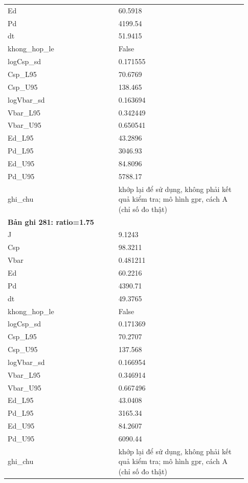 \begin{longtable}{p{0.43\linewidth}p{0.50\linewidth}}
Ed & 60.5918 \\
Pd & 4199.54 \\
dt & 51.9415 \\
khong\_\allowbreak hop\_\allowbreak le & False \\
logCsp\_\allowbreak sd & 0.171555 \\
Csp\_\allowbreak L95 & 70.6769 \\
Csp\_\allowbreak U95 & 138.465 \\
logVbar\_\allowbreak sd & 0.163694 \\
Vbar\_\allowbreak L95 & 0.342449 \\
Vbar\_\allowbreak U95 & 0.650541 \\
Ed\_\allowbreak L95 & 43.2896 \\
Pd\_\allowbreak L95 & 3046.93 \\
Ed\_\allowbreak U95 & 84.8096 \\
Pd\_\allowbreak U95 & 5788.17 \\
ghi\_\allowbreak chu & khớp lại để sử dụng, không phải kết quả kiểm tra; mô hình gpr, cách A (chỉ số đo thật) \\
\midrule
\multicolumn{2}{p{0.95\linewidth}}{\textbf{Bản ghi 281: ratio=1.75}} \\
J & 9.1243 \\
Csp & 98.3211 \\
Vbar & 0.481211 \\
Ed & 60.2216 \\
Pd & 4390.71 \\
dt & 49.3765 \\
khong\_\allowbreak hop\_\allowbreak le & False \\
logCsp\_\allowbreak sd & 0.171369 \\
Csp\_\allowbreak L95 & 70.2707 \\
Csp\_\allowbreak U95 & 137.568 \\
logVbar\_\allowbreak sd & 0.166954 \\
Vbar\_\allowbreak L95 & 0.346914 \\
Vbar\_\allowbreak U95 & 0.667496 \\
Ed\_\allowbreak L95 & 43.0408 \\
Pd\_\allowbreak L95 & 3165.34 \\
Ed\_\allowbreak U95 & 84.2607 \\
Pd\_\allowbreak U95 & 6090.44 \\
ghi\_\allowbreak chu & khớp lại để sử dụng, không phải kết quả kiểm tra; mô hình gpr, cách A (chỉ số đo thật) \\

\end{longtable}
